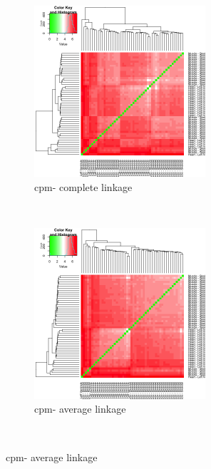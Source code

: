\begin{figure}[ht]
     \begin{subfigure}[t]{0.5\textwidth}
        \centering
        \includegraphics[height=2.5in]{../plots/heart_muscle_hierarchical_heatmap_cpm_complete.png}
        \caption{cpm- complete linkage}
    \end{subfigure}%
    ~
    \begin{subfigure}[t]{0.5\textwidth}
        \centering
        \includegraphics[height=2.5in]{../plots/heart_muscle_hierarchical_heatmap_cpm_average.png}
        \caption{cpm- average linkage}
    \end{subfigure}\\
    

\end{figure}
